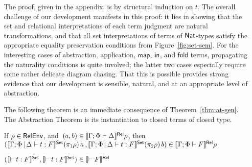\documentclass[runningheads]{llncs}
\newcommand{\map}{\mathsf{map}}
\begin{document}
The proof, {\color{red} given in the appendix}, is by structural
induction on
$t$. The overall challenge of our development manifests in this proof:
it lies in showing that the set and relational interpretations of each
term judgment are natural transformations, and that all set
interpretations of terms of $\mathsf{Nat}$-types satisfy the appropriate
equality preservation conditions from Figure~\ref{fig:set-sem}.  For
the interesting cases of abstraction, application, $\map$, $\mathsf{in}$, and
$\mathsf{fold}$ terms, propagating the naturality conditions is quite
involved; the latter two cases especially require some rather delicate
diagram chasing. That this is possible provides strong evidence that
our development is sensible, natural, and at an appropriate level of
abstraction.

The following theorem is an immediate consequence of
Theorem~\ref{thm:at-gen}. The Abstraction Theorem is its instantiation
to closed terms of closed type.
\begin{theorem}\label{thm:at-gen-rel}
  If
  $\rho \in \mathsf{RelEnv}$,
  and \,$(a, b) \in \llbracket{\Gamma; \Phi \vdash \Delta}\rrbracket^{\mathsf{Rel}} \rho$,
  then\\
  $(\llbracket{\Gamma; \Phi \,|\, \Delta \vdash t : F}\rrbracket^{\mathsf{Set}} (\pi_1 \rho) \,a \, ,
      \llbracket{\Gamma; \Phi \,|\, \Delta \vdash t : F }\rrbracket^{\mathsf{Set}} (\pi_2 \rho) \,b) \in 
    \llbracket{\Gamma; \Phi \vdash F}\rrbracket^{\mathsf{Rel}} \rho$
\end{theorem}
\begin{theorem}\label{thm:abstraction}
  $(\llbracket{\vdash t : F}\rrbracket^{\mathsf{Set}},\llbracket{\vdash t
  : F}\rrbracket^{\mathsf{Set}}) \in \llbracket{\vdash F}\rrbracket^{\mathsf{Rel}}$
\end{theorem}
\end{document}
